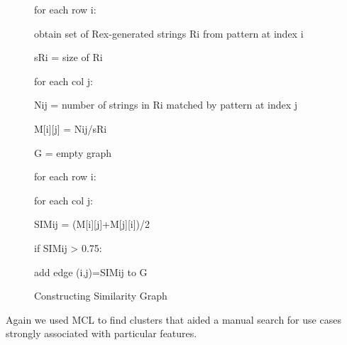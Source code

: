 \begin{figure}
\begin{description}
\setlength{\parskip}{0pt} %
\setlength{\itemindent}{0in}
\item for each row i:
\setlength{\itemindent}{0.2in}
\item obtain set of Rex-generated strings Ri from pattern at index i
\item sRi = size of Ri
\item for each col j:
\setlength{\itemindent}{0.4in}
\item Nij = number of strings in Ri matched by pattern at index j
\item M[i][j] = Nij/sRi
\setlength{\itemindent}{0in}
\item G = empty graph
\item for each row i:
\setlength{\itemindent}{0.2in}
\item for each col j:
\setlength{\itemindent}{0.4in}
\item SIMij = (M[i][j]+M[j][i])/2
\item if SIMij > 0.75:
\setlength{\itemindent}{0.6in}
\item add edge (i,j)=SIMij to G
\setlength{\itemindent}{0in}
\setlength{\parskip}{10pt} %
\end{description}
\caption{Constructing Similarity Graph \label{fig:similarityConstruction}}
\end{figure}

Again we used MCL to find clusters that aided a manual search for use cases strongly associated with particular features.



%

%









